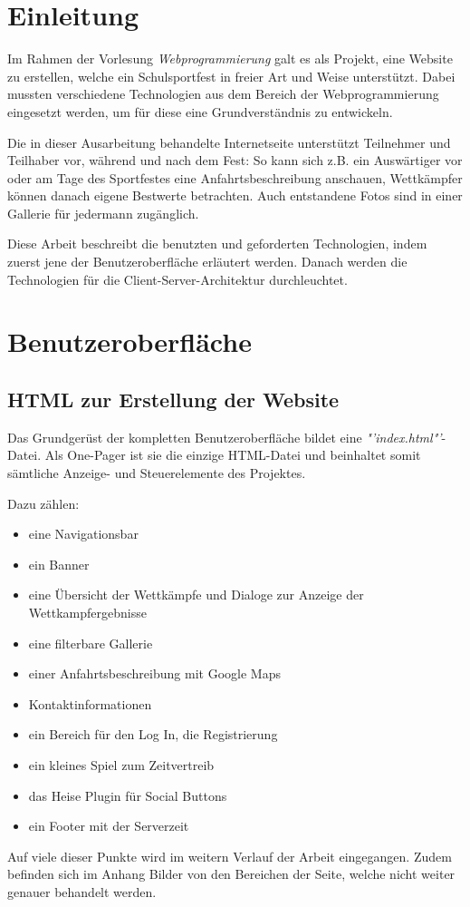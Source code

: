 \chapter{Einleitung}
\label{Einleitung}
Im Rahmen der Vorlesung \textit{Webprogrammierung} galt es als Projekt, eine Website zu erstellen, welche ein Schulsportfest in freier Art und Weise unterstützt. Dabei mussten verschiedene Technologien aus dem Bereich der Webprogrammierung eingesetzt werden, um für diese eine Grundverständnis zu entwickeln.
\par
Die in dieser Ausarbeitung behandelte Internetseite unterstützt Teilnehmer und Teilhaber vor, während und nach dem Fest: So kann sich z.B. ein Auswärtiger vor oder am Tage des Sportfestes eine Anfahrtsbeschreibung anschauen, Wettkämpfer können danach eigene Bestwerte betrachten. Auch entstandene Fotos sind in einer Gallerie für jedermann zugänglich.
\par
Diese Arbeit beschreibt die benutzten und geforderten Technologien, indem zuerst jene der Benutzeroberfläche erläutert werden. Danach werden die Technologien für die Client-Server-Architektur durchleuchtet.

\chapter{Benutzeroberfläche}
\label{Benutzeroberfläche}

\section{HTML zur Erstellung der Website}
\label{HTML zur Erstellung der Website}
Das Grundgerüst der kompletten Benutzeroberfläche bildet eine \textit{"'index.html"'}-Datei. Als One-Pager ist sie die einzige HTML-Datei und beinhaltet somit sämtliche Anzeige- und Steuerelemente des Projektes.
\par
Dazu zählen:
\begin{itemize}
	\item eine Navigationsbar
	\item ein Banner
	\item eine Übersicht der Wettkämpfe und Dialoge zur Anzeige der Wettkampfergebnisse
	\item eine filterbare Gallerie
	\item einer Anfahrtsbeschreibung mit Google Maps
	\item Kontaktinformationen
	\item ein Bereich für den Log In, die Registrierung \item ein kleines Spiel zum Zeitvertreib
	\item das Heise Plugin für Social Buttons
	\item ein Footer mit der Serverzeit	
\end{itemize}
Auf viele dieser Punkte wird im weitern Verlauf der Arbeit eingegangen. Zudem befinden sich im Anhang Bilder von den Bereichen der Seite, welche nicht weiter genauer behandelt werden.

